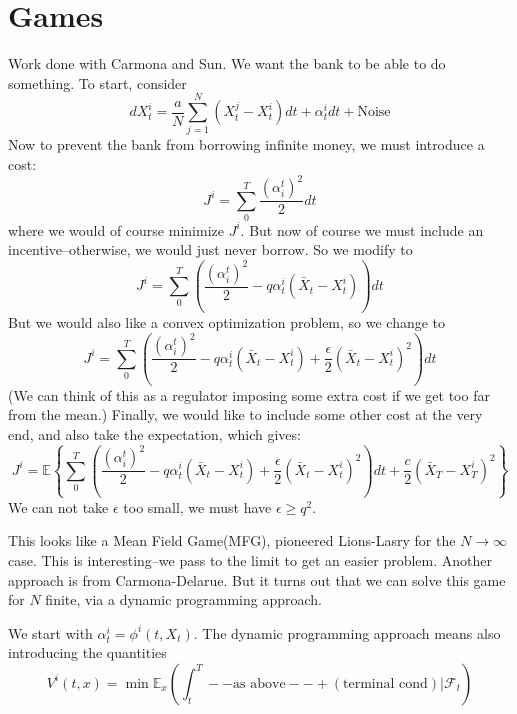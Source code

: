 \section{Games}
Work done with Carmona and Sun. We want the bank to be able to do something. To start, consider
\begin{equation}
	dX_t^i = \frac{a}{N} \sum_{j=1}^N (X_t^j - X_t^i)dt + \alpha_t^i dt + \text{Noise}
\end{equation}
Now to prevent the bank from borrowing infinite money, we must introduce a cost:
\begin{equation}
	J^i = \sum_{0}^T \frac{(\alpha_i^t)^2}{2} dt
\end{equation}
where we would of course minimize $J^i$. But now of course we must include an incentive--otherwise, we would just never borrow. So we modify to
\begin{equation}
	J^i = \sum_{0}^T (\frac{(\alpha_i^t)^2}{2} - q \alpha_t^i(\bar{X}_t - X_t^i) )dt
\end{equation}
But we would also like a convex optimization problem, so we change to
\begin{equation}
	J^i = \sum_{0}^T (\frac{(\alpha_i^t)^2}{2} - q \alpha_t^i(\bar{X}_t - X_t^i) + \frac{\epsilon}{2}(\bar{X}_t - X_t^i)^2)dt
\end{equation}
(We can think of this as a regulator imposing some extra cost if we get too far from the mean.) Finally, we would like to include some other cost at the very end, and also take the expectation, which gives:
\begin{equation}
	J^i = \mathbb{E} \left\{ \sum_{0}^T (\frac{(\alpha_i^t)^2}{2} - q \alpha_t^i(\bar{X}_t - X_t^i) + \frac{\epsilon}{2}(\bar{X}_t - X_t^i)^2)dt + \frac{c}{2}(\bar{X}_T - X_T^i)^2 \right\}
\end{equation}
We can not take $\epsilon$ too small, we must have $\epsilon \geq q^2$.

This looks like a Mean Field Game(MFG), pioneered Lions-Lasry for the $N\to\infty$ case. This is interesting--we pass to the limit to get an easier problem. Another approach is from Carmona-Delarue. But it turns out that we can solve this game for $N$ finite, via a dynamic programming approach.

We start with $\alpha_t^i = \phi^i(t,X_t)$. The dynamic programming approach means also introducing the quantities
\begin{equation}
	V^i(t,x) = \min \mathbb{E}_x \left( \int_t^T --\text{as above}-- + (\text{terminal cond}) | \mathcal{F}_t \right)
\end{equation}

